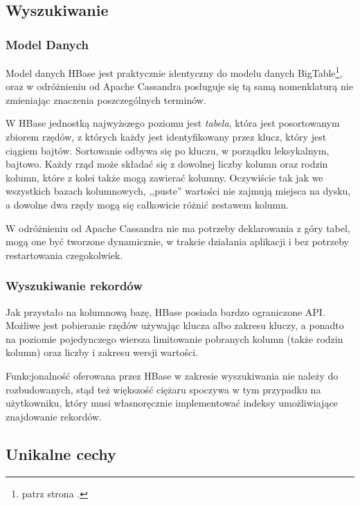 \subsection*{Wyszukiwanie}

\subsubsection*{Model Danych}

Model danych HBase jest praktycznie identyczny do modelu danych BigTable\footnote{patrz strona \pageref{google-bigtable-model-danych}.}, oraz w odróżnieniu od Apache Cassandra posługuje się tą samą nomenklaturą nie zmieniając znaczenia poszczególnych terminów.

W HBase jednostką najwyższego poziomu jest \emph{tabela}, która jest posortowanym zbiorem rzędów, z których każdy jest identyfikowany przez klucz, który jest ciągiem bajtów.
Sortowanie odbywa się po kluczu, w porządku leksykalnym, bajtowo.
Każdy rząd może składać się z dowolnej liczby kolumn oraz rodzin kolumn, które z kolei także mogą zawierać kolumny.
Oczywiście tak jak we wszystkich bazach kolumnowych, ,,puste'' wartości nie zajmują miejsca na dysku, a dowolne dwa rzędy mogą się całkowicie różnić zestawem kolumn.

W odróżnieniu od Apache Cassandra nie ma potrzeby deklarowania z góry tabel, mogą one być tworzone dynamicznie, w trakcie działania aplikacji i bez potrzeby restartowania czegokolwiek.

\subsubsection*{Wyszukiwanie rekordów}

Jak przystało na kolumnową bazę, HBase posiada bardzo ograniczone API.
Możliwe jest pobieranie rzędów używając klucza albo zakresu kluczy, a ponadto na poziomie pojedynczego wiersza limitowanie pobranych kolumn (także rodzin kolumn) oraz liczby i zakresu wersji wartości.

Funkcjonalność oferowana przez HBase w zakresie wyszukiwania nie należy do rozbudowanych, stąd też większość ciężaru spoczywa w tym przypadku na użytkowniku, który musi własnoręcznie implementować indeksy umożliwiające znajdowanie rekordów.

\subsection*{Unikalne cechy}

